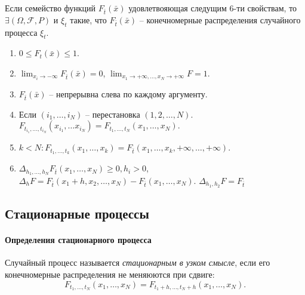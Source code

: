 \begin{theorem}[Колмогорова]
  Если семейство функций $F_{\bar{t}} (\bar{x})$ удовлетвояющая следущим 6-ти свойствам,
  то $\exists (\Omega, \mathcal{F}, P)$ и $\xi_t$ такие, что $F_{\bar{t}} (\bar{x})$ --
  конечномерные распределения случайного процесса $\xi_t$.
  \begin{enumerate}
    \item $0 \leqslant F_{t} (\bar{x}) \leqslant 1$.
    \item $\lim_{x_i \to -\infty} F_{\bar{t}} (\bar{x}) = 0$,
      $\lim_{x_1 \to +\infty, \dots, x_N \to +\infty} F = 1$.
    \item $F_{\bar{t}} (\bar{x})$ -- непрерывна слева по каждому аргументу.
    \item Если $(i_1, \dots, i_N)$ -- перестановка $(1, 2, \dots, N)$.
      $F_{t_{i_1}, \dots, t_{i_N}} (x_{i_1}, \dots x_{i_N})
      = F_{t_1, \dots, t_N} (x_1, \dots, x_N).$
    \item $k < N : F_{t_1, \dots, t_k} (x_1, \dots, x_k) = F_{\bar{t}} (x_1, \dots, x_k, +\infty, \dots, +\infty)$.
    \item $\Delta_{h_1, \dots, h_N} F_{\bar{t}} (x_1, \dots, x_N) \geqslant 0, h_i > 0$,
      $\Delta_h F = F_{\bar{t}} (x_1+h, x_2, \dots, x_N) - F_{\bar{t}} (x_1, \dots, x_N)$.
      $\Delta_{h_1, h_2} F = F_\bar{t} $ %
  \end{enumerate}
\end{theorem}

\subsection{Стационарные процессы}

\paragraph{Определения стационарного процесса}

\begin{definition}
  Случайный процесс называется \emph{стационарным в узком смысле}, если его конечномерные
  распределения не меняюются при сдвиге:
  \[
    F_{t_1, \dots, t_N}(x_1, \dots, x_N) = F_{t_1+h, \dots, t_N+h} (x_1, \dots, x_N).
  \]
\end{definition}

